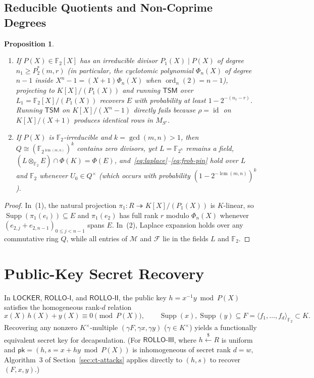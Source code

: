 \documentclass[11pt,a4paper]{article}
\newtheorem{proposition}[theorem]{Proposition}
\theoremstyle{definition}
\theoremstyle{remark}
\newcommand{\F}{\mathbb{F}}
\newcommand{\Ftwo}{\mathbb{F}_2}
\newcommand{\Supp}{\operatorname{Supp}}
\newcommand{\lcm}{\operatorname{lcm}}
\newcommand{\TSM}{\mathsf{TSM}}
\begin{document}
\subsection{Reducible Quotients and Non-Coprime Degrees}
\label{subsec:ct-split}

\begin{proposition}
\label{prop:split-ring}
\begin{enumerate}[leftmargin=1.8em,itemsep=2pt]
    \item If $P(X) \in \Ftwo[X]$ has an irreducible divisor $P_1(X) \mid P(X)$ of degree $n_1 \ge P_2^*(m, r)$ (in particular, the cyclotomic polynomial $\Phi_n(X)$ of degree $n - 1$ inside $X^n - 1 = (X+1)\Phi_n(X)$ when $\operatorname{ord}_n(2) = n - 1$), projecting to $K[X]/(P_1(X))$ and running $\TSM$ over $L_1 = \Ftwo[X]/(P_1(X))$ recovers $E$ with probability at least $1 - 2^{-(n_1 - r)}$. Running $\TSM$ on $K[X]/(X^n - 1)$ directly fails because $\rho = \operatorname{id}$ on $K[X]/(X+1)$ produces identical rows in $M_{S'}$.
    \item If $P(X)$ is $\Ftwo$-irreducible and $k = \gcd(m, n) > 1$, then $Q \cong (\F_{2^{\lcm(m,n)}})^k$ contains zero divisors, yet $L = \F_{2^n}$ remains a field, $(L \otimes_{\Ftwo} E) \cap \Phi(K) = \Phi(E)$, and~\eqref{eq:laplace}--\eqref{eq:frob-pin} hold over $L$ and $\Ftwo$ whenever $U_0 \in Q^\times$ (which occurs with probability $(1 - 2^{-\lcm(m,n)})^k$).
\end{enumerate}
\end{proposition}

\begin{proof}
In~(1), the natural projection $\pi_1: R \twoheadrightarrow K[X]/(P_1(X))$ is $K$-linear, so $\Supp(\pi_1(e_i)) \subseteq E$ and $\pi_1(e_2)$ has full rank $r$ modulo $\Phi_n(X)$ whenever $(e_{2,j} + e_{2,n-1})_{0 \le j < n-1}$ spans $E$. In~(2), Laplace expansion holds over any commutative ring $Q$, while all entries of $\mathcal{M}$ and $\mathcal{F}$ lie in the fields $L$ and $\Ftwo$.
\end{proof}

\section{Public-Key Secret Recovery}
\label{sec:pk-attacks}

In $\mathsf{LOCKER}$, $\mathsf{ROLLO\text{-}I}$, and $\mathsf{ROLLO\text{-}II}$, the public key $h = x^{-1} y \bmod P(X)$ satisfies the homogeneous rank-$d$ relation
\[
    x(X)\, h(X) + y(X) \equiv 0 \pmod{P(X)}, \qquad \Supp(x), \Supp(y) \subseteq F = \langle f_1, \dots, f_d \rangle_{\Ftwo} \subset K.
\]
Recovering any nonzero $K^\times$-multiple $(\gamma F, \gamma x, \gamma y)$ ($\gamma \in K^\times$) yields a functionally equivalent secret key for decapsulation. (For $\mathsf{ROLLO\text{-}III}$, where $h \xleftarrow{\$} R$ is uniform and $\mathsf{pk} = (h, s = x + h y \bmod P(X))$ is inhomogeneous of secret rank $d = w$, Algorithm~3 of Section~\ref{sec:ct-attacks} applies directly to $(h, s)$ to recover $(F, x, y)$.)
\end{document}
